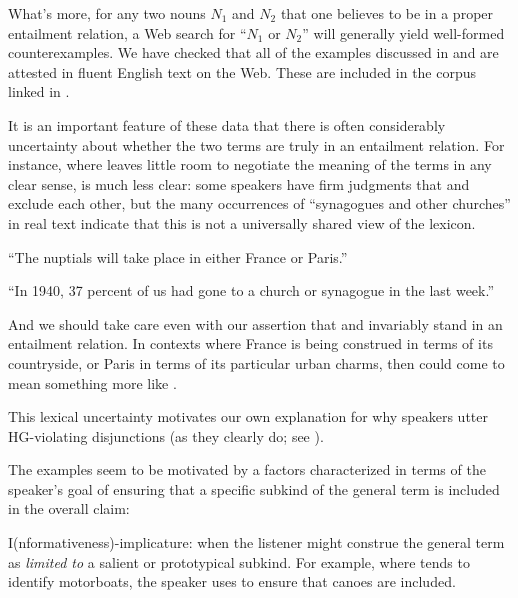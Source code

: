 \documentclass{article}
\begin{document}
\begin{examples}
\item What's more, for any two nouns $N_{1}$ and $N_{2}$ that one
  believes to be in a proper entailment relation, a Web search for
  ``$N_{1}$ or $N_{2}$'' will generally yield well-formed
  counterexamples. We have checked that all of the examples discussed
  in \citealt{Hurford:1974} and \citealt{Singh:2008} are attested in
  fluent English text on the Web. These are included in the corpus
  linked in .

\item It is an important feature of these data that there is often
  considerably uncertainty about whether the two terms are truly in an
  entailment relation. For instance, where  leaves
  little room to negotiate the meaning of the terms in any clear
  sense,  is much less clear: some speakers have
  firm judgments that  and  exclude each
  other, but the many occurrences of ``synagogues and other churches''
  in real text indicate that this is not a universally shared view of
  the lexicon.

  \begin{examples}
  \item\label{franceorparis} ``The nuptials will take place in either
    France or Paris.''
  \item\label{churchorsynagogue} ``In 1940, 37 percent of us had gone
    to a church or synagogue in the last week.''
  \end{examples}

\item And we should take care even with our assertion that
   and  invariably stand in an entailment
  relation. In contexts where France is being construed in terms of
  its countryside, or Paris in terms of its particular urban charms,
  then  could come to mean something more like
  .

\item This lexical uncertainty motivates our own explanation for why
  speakers utter HG-violating disjunctions (as they clearly do; see
  ).

\item The examples seem to be motivated by a factors characterized in
  terms of the speaker's goal of ensuring that a specific subkind of
  the general term is included in the overall claim:

  \begin{examples}
  \item I(nformativeness)-implicature: when the listener might
    construe the general term as \emph{limited to} a salient or
    prototypical subkind. For example, where  tends to
    identify motorboats, the speaker uses  to
    ensure that canoes are included.
    

\end{examples}
\end{examples}
\end{document}
